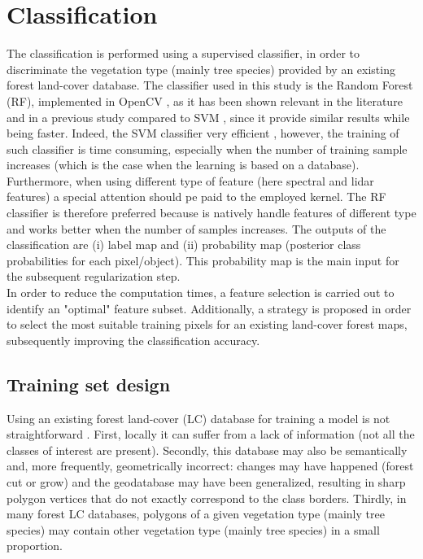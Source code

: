 \section{Classification}
The classification is performed using a supervised classifier, in order to discriminate the vegetation type (mainly tree species) provided by an existing forest land-cover database. The classifier used in this study is the Random Forest (RF), implemented in OpenCV \citep{opencv}, as it has been shown relevant in the literature \citep{belgiu2016random} and in a previous study compared to SVM \citep{dechesne2016forest}, since it provide similar results while being faster. Indeed, the SVM classifier very efficient \citep{vapnik2013nature}, however, the training of such classifier is time consuming, especially when the number of training sample increases (which is the case when the learning is based on a database). Furthermore, when using different type of feature (here spectral and lidar features) a special attention should pe paid to the employed kernel. The RF classifier is therefore preferred because is natively handle features of different type and works better when the number of samples increases. The outputs of the classification are (i) label map and (ii) probability map (posterior class probabilities for each pixel/object). This probability map is the main input for the subsequent regularization step. \\
In order to reduce the computation times, a feature selection is carried out to identify an "optimal" feature subset. Additionally, a strategy is proposed in order to select the most suitable training pixels for an existing land-cover forest maps, subsequently improving the classification accuracy.

\subsection{Training set design}
Using an existing forest land-cover (LC) database for training a model is not straightforward \citep{isprsannals-II-3-W2-13-2013,rs6053965,isprs-annals-III-7-133-2016}. First, locally it can suffer from a lack of information (not all the classes of interest are present). Secondly, this database may also be semantically and, more frequently, geometrically incorrect: changes may have happened (forest cut or grow) and the geodatabase may have been generalized, resulting in sharp polygon vertices that do not exactly correspond to the class borders. Thirdly, in many forest LC databases, polygons of a given vegetation type (mainly tree species) may contain other vegetation type (mainly tree species) in a small proportion.

